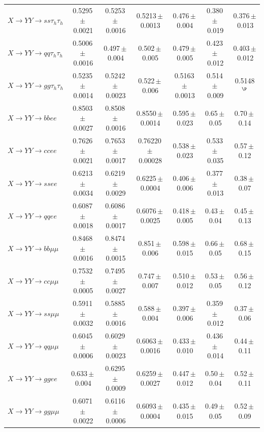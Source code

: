 \documentclass[12pt]{article}   %
\begin{document}
\begin{landscape}
{\begin{longtable}{@{\extracolsep{\fill}}lcccccc@{}}
$X\to YY\to ss\tau_h\tau_h$ & 0.5295\,$\pm$\,0.0021 & 0.5253\,$\pm$\,0.0016 & 0.5213\,$\pm$\,0.0013 & 0.476\,$\pm$\,0.004 & 0.380\,$\pm$\,0.019 & 0.376\,$\pm$\,0.013 \\
$X\to YY\to qq\tau_h\tau_h$ & 0.5006\,$\pm$\,0.0016 & 0.497\,$\pm$\,0.004 & 0.502\,$\pm$\,0.005 & 0.479\,$\pm$\,0.005 & 0.423\,$\pm$\,0.012 & 0.403\,$\pm$\,0.012 \\
$X\to YY\to gg\tau_h\tau_h$ & 0.5235\,$\pm$\,0.0014 & 0.5242\,$\pm$\,0.0023 & 0.522\,$\pm$\,0.006 & 0.5163\,$\pm$\,0.0013 & 0.514\,$\pm$\,0.009 & 0.5148$^{\P}$ \\
\midrule
$X\to YY\to bbee$ & 0.8503\,$\pm$\,0.0027 & 0.8508\,$\pm$\,0.0016 & 0.8550\,$\pm$\,0.0014 & 0.595\,$\pm$\,0.023 & 0.65\,$\pm$\,0.05 & 0.70\,$\pm$\,0.14 \\
$X\to YY\to ccee$ & 0.7626\,$\pm$\,0.0021 & 0.7653\,$\pm$\,0.0017 & 0.76220\,$\pm$\,0.00028 & 0.538\,$\pm$\,0.023 & 0.533\,$\pm$\,0.035 & 0.57\,$\pm$\,0.12 \\
$X\to YY\to ssee$ & 0.6213\,$\pm$\,0.0034 & 0.6219\,$\pm$\,0.0029 & 0.6225\,$\pm$\,0.0004 & 0.406\,$\pm$\,0.006 & 0.377\,$\pm$\,0.013 & 0.38\,$\pm$\,0.07 \\
$X\to YY\to qqee$ & 0.6087\,$\pm$\,0.0018 & 0.6086\,$\pm$\,0.0017 & 0.6076\,$\pm$\,0.0025 & 0.418\,$\pm$\,0.005 & 0.43\,$\pm$\,0.04 & 0.45\,$\pm$\,0.13 \\
$X\to YY\to bb\mu\mu$ & 0.8468\,$\pm$\,0.0016 & 0.8474\,$\pm$\,0.0015 & 0.851\,$\pm$\,0.006 & 0.598\,$\pm$\,0.015 & 0.66\,$\pm$\,0.05 & 0.68\,$\pm$\,0.15 \\
$X\to YY\to cc\mu\mu$ & 0.7532\,$\pm$\,0.0005 & 0.7495\,$\pm$\,0.0027 & 0.747\,$\pm$\,0.007 & 0.510\,$\pm$\,0.012 & 0.53\,$\pm$\,0.05 & 0.56\,$\pm$\,0.12 \\
$X\to YY\to ss\mu\mu$ & 0.5911\,$\pm$\,0.0032 & 0.5885\,$\pm$\,0.0016 & 0.588\,$\pm$\,0.004 & 0.397\,$\pm$\,0.006 & 0.359\,$\pm$\,0.012 & 0.37\,$\pm$\,0.06 \\
$X\to YY\to qq\mu\mu$ & 0.6045\,$\pm$\,0.0006 & 0.6029\,$\pm$\,0.0023 & 0.6063\,$\pm$\,0.0016 & 0.433\,$\pm$\,0.010 & 0.436\,$\pm$\,0.014 & 0.44\,$\pm$\,0.11 \\
$X\to YY\to ggee$ & 0.633\,$\pm$\,0.004 & 0.6295\,$\pm$\,0.0009 & 0.6259\,$\pm$\,0.0027 & 0.447\,$\pm$\,0.012 & 0.50\,$\pm$\,0.04 & 0.52\,$\pm$\,0.11 \\
$X\to YY\to gg\mu\mu$ & 0.6071\,$\pm$\,0.0022 & 0.6116\,$\pm$\,0.0006 & 0.6093\,$\pm$\,0.0004 & 0.435\,$\pm$\,0.015 & 0.49\,$\pm$\,0.05 & 0.52\,$\pm$\,0.09 \\
\midrule

\end{longtable}}
\end{landscape}
\end{document}
